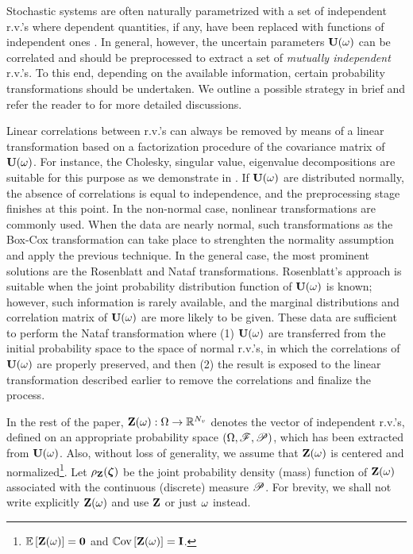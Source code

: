 Stochastic systems are often naturally parametrized with a set of independent r.v.'s where dependent quantities, if any, have been replaced with functions of independent ones \cite{xiu2009}. In general, however, the uncertain parameters $\mathbf{U}(\omega)$ can be correlated and should be preprocessed to extract a set of \emph{mutually independent} r.v.'s. To this end, depending on the available information, certain probability transformations should be undertaken. We outline a possible strategy in brief and refer the reader to \cite{eldred2009, xiu2009} for more detailed discussions.

Linear correlations between r.v.'s can always be removed by means of a linear transformation based on a factorization procedure of the covariance matrix of $\mathbf{U}(\omega)$. For instance, the Cholesky, singular value, eigenvalue decompositions \cite{press2007} are suitable for this purpose as we demonstrate in . If $\mathbf{U}(\omega)$ are distributed normally, the absence of correlations is equal to independence, and the preprocessing stage finishes at this point. In the non-normal case, nonlinear transformations are commonly used. When the data are nearly normal, such transformations as the Box-Cox transformation \cite{box1964} can take place to strenghten the normality assumption and apply the previous technique. In the general case, the most prominent solutions are the Rosenblatt \cite{rosenblatt1952} and Nataf \cite{hongshuang2008} transformations. Rosenblatt's approach is suitable when the joint probability distribution function of $\mathbf{U}(\omega)$ is known; however, such information is rarely available, and the marginal distributions and correlation matrix of $\mathbf{U}(\omega)$ are more likely to be given. These data are sufficient to perform the Nataf transformation where (1) $\mathbf{U}(\omega)$ are transferred from the initial probability space to the space of normal r.v.'s, in which the correlations of $\mathbf{U}(\omega)$ are properly preserved, and then (2) the result is exposed to the linear transformation described earlier to remove the correlations and finalize the process.

In the rest of the paper, $\mathbf{Z}(\omega): \Omega \to \mathbb{R}^{N_v}$ denotes the vector of independent r.v.'s, defined on an appropriate probability space $(\Omega, \mathscr{F}, \mathscr{P})$, which has been extracted from $\mathbf{U}(\omega)$. Also, without loss of generality, we assume that $\mathbf{Z}(\omega)$ is centered and normalized\footnote{$\oExp{\vZ(\o)} = \mZero$ and $\oCov{\vZ(\o)} = \mI$.}. Let $\rho_{\mathbf{Z}}(\boldsymbol{\zeta})$ be the joint probability density (mass) function of $\mathbf{Z}(\omega)$ associated with the continuous (discrete) measure $\mathscr{P}$. For brevity, we shall not write explicitly $\mathbf{Z}(\omega)$ and use $\mathbf{Z}$ or just $\omega$ instead.
